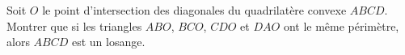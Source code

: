 Soit $O$ le point d'intersection des diagonales du quadrilatère convexe $ABCD$. Montrer que si les triangles $ABO$, $BCO$, $CDO$ et $DAO$ ont le même périmètre, alors $ABCD$ est un losange.
